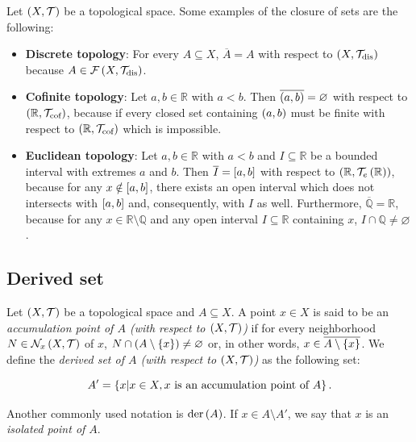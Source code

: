 \begin{example}
  Let $\left(X,\mathcal{T}\right)$ be a topological space. Some examples of the closure of sets are the following:

  \begin{itemize}
    \item \textbf{Discrete topology}: For every $A\subseteq X$, $\overline{A}=A$ with respect to $\left(X,\mathcal{T}_{\text{dis}}\right)$ because $A\in\mathcal{F}\left(X,\mathcal{T}_{\text{dis}}\right)$.
    \item \textbf{Cofinite topology}: Let $a,b\in\mathbb{R}$ with $a<b$. Then $\overline{\left(a,b\right)}=\varnothing$ with respect to $\left(\mathbb{R},\mathcal{T}_{\text{cof}}\right)$, because if every closed set containing $\left(a,b\right)$ must be finite with respect to $\left(\mathbb{R},\mathcal{T}_{\text{cof}}\right)$ which is impossible.
    \item \textbf{Euclidean topology}: Let $a,b\in\mathbb{R}$ with $a<b$ and $I\subseteq\mathbb{R}$ be a bounded interval with extremes $a$ and $b$. Then $\overline{I}=\left[a,b\right]$ with respect to $\left(\mathbb{R},\mathcal{T}_e\left(\mathbb{R}\right)\right)$, because for any $x\notin\left[a,b\right]$, there exists an open interval which does not intersects with $\left[a,b\right]$ and, consequently, with $I$ as well. Furthermore, $\overline{\mathbb{Q}}=\mathbb{R}$, because for any $x\in\mathbb{R}\setminus\mathbb{Q}$ and any open interval $I\subseteq\mathbb{R}$ containing $x$, $I\cap\mathbb{Q}\neq\varnothing$.
  \end{itemize}
\end{example}

\subsection{Derived set}
\begin{definition}
  Let $\left(X,\mathcal{T}\right)$ be a topological space and $A\subseteq X$. A point $x\in X$ is said to be an \emph{accumulation point of $A$ (with respect to $\left(X,\mathcal{T}\right)$)} if for every neighborhood $N\in\mathcal{N}_x\left(X,\mathcal{T}\right)$ of $x$, $N\cap\left(A\setminus\left\{x\right\}\right)\neq\varnothing$ or, in other words, $x\in\overline{A\setminus\left\{x\right\}}$. We define the \emph{derived set of $A$ (with respect to $\left(X,\mathcal{T}\right)$)} as the following set:

  \begin{equation}
    A'=\left\{x\middle|x\in X, x\text{ is an accumulation point of $A$}\right\}.
  \end{equation}

  Another commonly used notation is $\text{der}\left(A\right)$. If $x\in A\setminus A'$, we say that $x$ is an \emph{isolated point of $A$}.
\end{definition}

